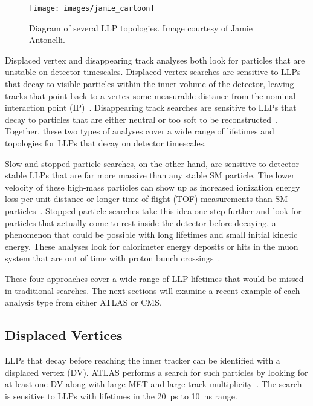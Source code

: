 \documentclass[12pt]{article}
\begin{document}
        \noindent \begin{figure}[htbp] \begin{center}
        \texttt{[image: images/jamie\_cartoon]}
        \caption{Diagram of several LLP topologies. Image courtesy of Jamie Antonelli.}
        \label{jamie_cartoon}
        \end{center} \end{figure}

        Displaced vertex and disappearing track analyses both look for particles that are unstable on detector timescales. Displaced vertex searches are sensitive to LLPs that decay to visible particles within the inner volume of the detector, leaving tracks that point back to a vertex some measurable distance from the nominal interaction point (IP)~\cite{atlas_displaced}. Disappearing track searches are sensitive to LLPs that decay to particles that are either neutral or too soft to be reconstructed~\cite{atlas_disappearing}. Together, these two types of analyses cover a wide range of lifetimes and topologies for LLPs that decay on detector timescales.

        Slow and stopped particle searches, on the other hand, are sensitive to detector-stable LLPs that are far more massive than any stable SM particle. The lower velocity of these high-mass particles can show up as increased ionization energy loss per unit distance or longer time-of-flight (TOF) measurements than SM particles~\cite{cms_hscp}. Stopped particle searches take this idea one step further and look for particles that actually come to rest inside the detector before decaying, a phenomenon that could be possible with long lifetimes and small initial kinetic energy. These analyses look for calorimeter energy deposits or hits in the muon system that are out of time with proton bunch crossings~\cite{cms_stopped}.

        These four approaches cover a wide range of LLP lifetimes that would be missed in traditional searches. The next sections will examine a recent example of each analysis type from either ATLAS or CMS.

    \subsection{Displaced Vertices}
        LLPs that decay before reaching the inner tracker can be identified with a displaced vertex (DV). ATLAS performs a search for such particles by looking for at least one DV along with large MET and large track multiplicity~\cite{atlas_displaced}. The search is sensitive to LLPs with lifetimes in the \SI{20}{\pico\s} to \SI{10}{\nano\s} range.
\end{document}
